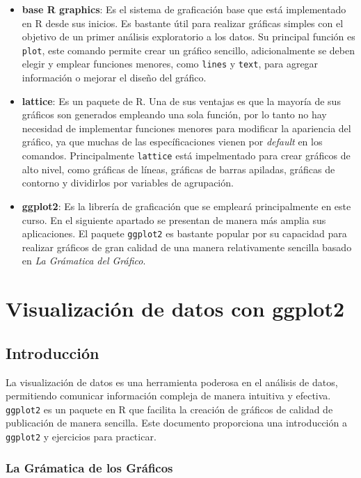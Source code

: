 \documentclass[
]{book}
\begin{document}
\begin{itemize}
\item
  \textbf{base R graphics}: Es el sistema de graficación base que está implementado en R desde sus inicios. Es bastante útil para realizar gráficas simples con el objetivo de un primer análisis exploratorio a los datos. Su principal función es \texttt{plot}, este comando permite crear un gráfico sencillo, adicionalmente se deben elegir y emplear funciones menores, como \texttt{lines} y \texttt{text}, para agregar información o mejorar el diseño del gráfico.
\item
  \textbf{lattice}: Es un paquete de R. Una de sus ventajas es que la mayoría de sus gráficos son generados empleando una sola función, por lo tanto no hay necesidad de implementar funciones menores para modificar la apariencia del gráfico, ya que muchas de las específicaciones vienen por \emph{default} en los comandos. Principalmente \texttt{lattice} está impelmentado para crear gráficos de alto nivel, como gráficas de líneas, gráficas de barras apiladas, gráficas de contorno y dividirlos por variables de agrupación.
\item
  \textbf{ggplot2}: Es la librería de graficación que se empleará principalmente en este curso. En el siguiente apartado se presentan de manera más amplia sus aplicaciones. El paquete \texttt{ggplot2} es bastante popular por su capacidad para realizar gráficos de gran calidad de una manera relativamente sencilla basado en \emph{La Grámatica del Gráfico}.
\end{itemize}

\section{Visualización de datos con ggplot2}\label{visualizaciuxf3n-de-datos-con-ggplot2}

\subsection{Introducción}\label{introducciuxf3n}

La visualización de datos es una herramienta poderosa en el análisis de datos, permitiendo comunicar información compleja de manera intuitiva y efectiva. \texttt{ggplot2} es un paquete en R que facilita la creación de gráficos de calidad de publicación de manera sencilla. Este documento proporciona una introducción a \texttt{ggplot2} y ejercicios para practicar.

\subsubsection{La Grámatica de los Gráficos}\label{la-gruxe1matica-de-los-gruxe1ficos}
\end{document}
